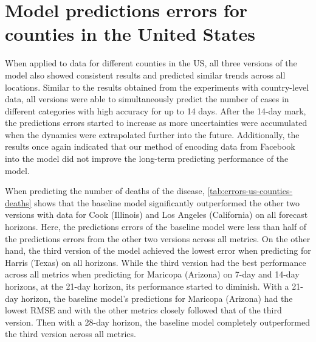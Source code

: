 \section{Model predictions errors for counties in the United States}

When applied to data for different counties in the \gls{US}, all three versions of the model also showed consistent results and predicted similar trends across all locations.
Similar to the results obtained from the experiments with country-level data, all versions were able to simultaneously predict the number of cases in different categories with high accuracy for up to 14 days.
After the 14-day mark, the predictions errors started to increase as more uncertainties were accumulated when the dynamics were extrapolated further into the future.
Additionally, the results once again indicated that our method of encoding data from Facebook into the model did not improve the long-term predicting performance of the model.

When predicting the number of deaths of the disease, \autoref{tab:errors-us-counties-deaths} shows that the baseline model significantly outperformed the other two versions with data for Cook (Illinois) and Los Angeles (California) on all forecast horizons.
Here, the predictions errors of the baseline model were less than half of the predictions errors from the other two versions across all metrics.
On the other hand, the third version of the model achieved the lowest error when predicting for Harris (Texas) on all horizons.
While the third version had the best performance across all metrics when predicting for Maricopa (Arizona) on 7-day and 14-day horizons, at the 21-day horizon, its performance started to diminish.
With a 21-day horizon, the baseline model's predictions for Maricopa (Arizona) had the lowest \gls{RMSE} and with the other metrics closely followed that of the third version.
Then with a 28-day horizon, the baseline model completely outperformed the third version across all metrics.


